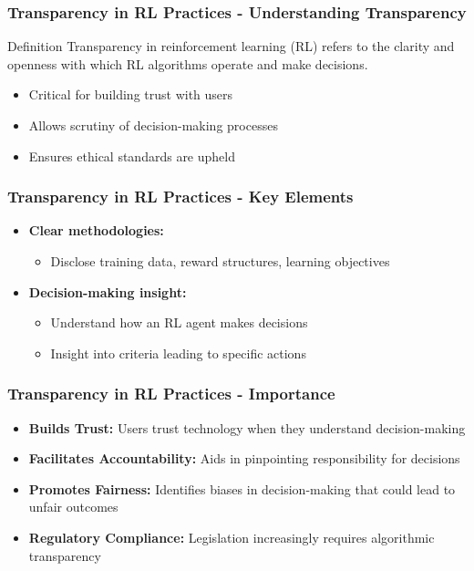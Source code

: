 \documentclass[aspectratio=169]{beamer}
\begin{document}
\begin{frame}[fragile]
    \frametitle{Transparency in RL Practices - Understanding Transparency}
    \begin{block}{Definition}
        Transparency in reinforcement learning (RL) refers to the clarity and openness with which RL algorithms operate and make decisions. 
    \end{block}
    \begin{itemize}
        \item Critical for building trust with users
        \item Allows scrutiny of decision-making processes
        \item Ensures ethical standards are upheld
    \end{itemize}
\end{frame}

\begin{frame}[fragile]
    \frametitle{Transparency in RL Practices - Key Elements}
    \begin{itemize}
        \item \textbf{Clear methodologies:} 
        \begin{itemize}
            \item Disclose training data, reward structures, learning objectives
        \end{itemize}
        
        \item \textbf{Decision-making insight:} 
        \begin{itemize}
            \item Understand how an RL agent makes decisions
            \item Insight into criteria leading to specific actions
        \end{itemize}
    \end{itemize}
\end{frame}

\begin{frame}[fragile]
    \frametitle{Transparency in RL Practices - Importance}
    \begin{itemize}
        \item \textbf{Builds Trust:} Users trust technology when they understand decision-making
        \item \textbf{Facilitates Accountability:} Aids in pinpointing responsibility for decisions
        \item \textbf{Promotes Fairness:} Identifies biases in decision-making that could lead to unfair outcomes
        \item \textbf{Regulatory Compliance:} Legislation increasingly requires algorithmic transparency
    \end{itemize}
\end{frame}
\end{document}
